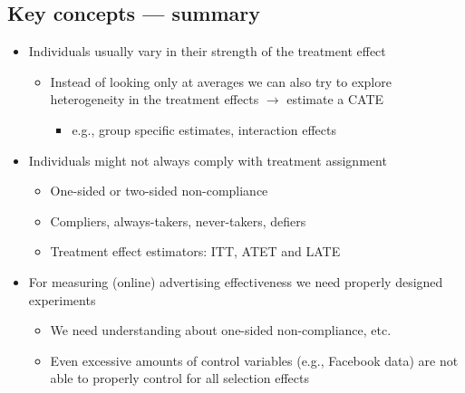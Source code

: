 \documentclass[10pt]{article}
\begin{document}
\subsection{Key concepts --- summary}
\begin{itemize}
    \item Individuals usually vary in their strength of the treatment effect 
    \begin{itemize}
        \item Instead of looking only at averages we can also try to explore heterogeneity in the treatment effects $\to $ estimate a CATE 
        \begin{itemize}
            \item e.g., group specific estimates, interaction effects 
        \end{itemize}
    \end{itemize}
    \item Individuals might not always comply with treatment assignment 
    \begin{itemize}
        \item One-sided or two-sided non-compliance
        \item Compliers, always-takers, never-takers, defiers 
        \item Treatment effect estimators: ITT, ATET and LATE 
    \end{itemize}
    \item For measuring (online) advertising effectiveness we need properly designed experiments 
    \begin{itemize}
        \item We need understanding about one-sided non-compliance, etc. 
        \item Even excessive amounts of control variables (e.g., Facebook data) are not able to properly control for all selection effects 
    \end{itemize}
\end{itemize}
\end{document}
